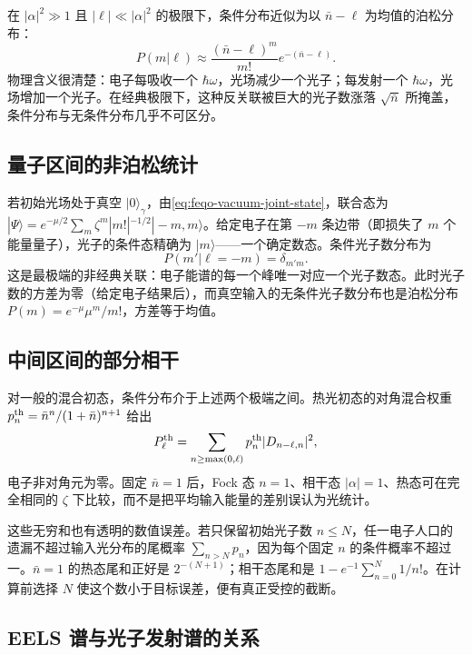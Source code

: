 在 \(|\alpha|^2\gg1\) 且 \(|\ell|\ll|\alpha|^2\) 的极限下，条件分布近似为以 \(\bar n-\ell\) 为均值的泊松分布：
\begin{equation}
P(m|\ell)\approx\frac{(\bar n-\ell)^m}{m!}e^{-(\bar n-\ell)}.
\label{eq:feqo-pinem-poisson-conditional}
\end{equation}
物理含义很清楚：电子每吸收一个 \(\hbar\omega\)，光场减少一个光子；每发射一个 \(\hbar\omega\)，光场增加一个光子。在经典极限下，这种反关联被巨大的光子数涨落 \(\sqrt{\bar n}\) 所掩盖，条件分布与无条件分布几乎不可区分。

\subsection{量子区间的非泊松统计}

若初始光场处于真空 \(|0\rangle_\gamma\)，由\cref{eq:feqo-vacuum-joint-state}，联合态为 \(|\Psi\rangle=e^{-\mu/2}\sum_m\zeta^m|m!|^{-1/2}|-m,m\rangle\)。给定电子在第 \(-m\) 条边带（即损失了 \(m\) 个能量量子），光子的条件态精确为 \(|m\rangle\)——一个确定数态。条件光子数分布为
\begin{equation}
P(m'|\ell=-m)=\delta_{m'm}.
\label{eq:feqo-vacuum-conditional}
\end{equation}
这是最极端的非经典关联：电子能谱的每一个峰唯一对应一个光子数态。此时光子数的方差为零（给定电子结果后），而真空输入的无条件光子数分布也是泊松分布 \(P(m)=e^{-\mu}\mu^m/m!\)，方差等于均值。

\subsection{中间区间的部分相干}

对一般的混合初态，条件分布介于上述两个极端之间。热光初态的对角混合权重 \(p_n^{\rm th}=\bar n^n/(1+\bar n)^{n+1}\) 给出
\[
P_\ell^{\rm th}=\sum_{n\geq\max(0,\ell)}p_n^{\rm th}|D_{n-\ell,n}|^2,
\]
电子非对角元为零。固定 \(\bar n=1\) 后，Fock 态 \(n=1\)、相干态 \(|\alpha|=1\)、热态可在完全相同的 \(\zeta\) 下比较，而不是把平均输入能量的差别误认为光统计。

这些无穷和也有透明的数值误差。若只保留初始光子数 \(n\leq N\)，任一电子人口的遗漏不超过输入光分布的尾概率 \(\sum_{n>N}p_n\)，因为每个固定 \(n\) 的条件概率不超过一。\(\bar n=1\) 的热态尾和正好是 \(2^{-(N+1)}\)；相干态尾和是 \(1-e^{-1}\sum_{n=0}^N1/n!\)。在计算前选择 \(N\) 使这个数小于目标误差，便有真正受控的截断。

\subsection{EELS 谱与光子发射谱的关系}

